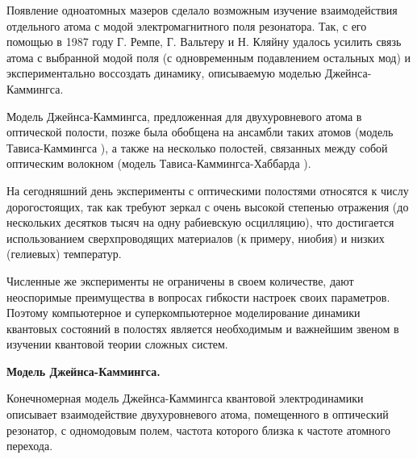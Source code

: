 Появление одноатомных мазеров сделало возможным изучение взаимодействия отдельного атома с модой электромагнитного поля резонатора. Так, с его помощью в 1987 году Г. Ремпе, Г. Вальтеру и Н. Кляйну \cite{rempe} удалось усилить связь атома с выбранной модой поля (с одновременным подавлением остальных мод) и экспериментально воссоздать динамику, описываемую моделью Джейнса-Каммингса.

Модель Джейнса-Каммингса, предложенная для двухуровневого атома в оптической полости, позже была обобщена на ансамбли таких атомов (модель Тависа-Каммингса \cite{tc_exact_solution,tc_a_study}), а также на несколько полостей, связанных между собой оптическим волокном (модель Тависа-Каммингса-Хаббарда \cite{tch_photon_blockade,tch_emergence,tch_quality,tch_miao}).

На сегодняшний день эксперименты с оптическими полостями \cite{cavity_exp_1,cavity_exp_2,cavity_exp_3} относятся к числу дорогостоящих, так как требуют зеркал с очень высокой степенью отражения (до нескольких десятков тысяч на одну рабиевскую осцилляцию), что достигается использованием сверхпроводящих материалов (к примеру, ниобия) и низких (гелиевых) температур.

Численные же эксперименты не ограничены в своем количестве, дают неоспоримые преимущества в вопросах гибкости настроек своих параметров. Поэтому компьютерное и суперкомпьютерное моделирование динамики квантовых состояний в полостях является необходимым и важнейшим звеном в изучении квантовой теории сложных систем.

\clearpage
\indent\textbf{Модель Джейнса-Каммингса.}

Конечномерная модель Джейнса-Каммингса квантовой электродинамики описывает взаимодействие двухуровневого атома, помещенного в оптический резонатор, с одномодовым полем, частота которого близка к частоте атомного перехода.

\begin{figure}[h!]
	\noindent{}
\end{figure}

